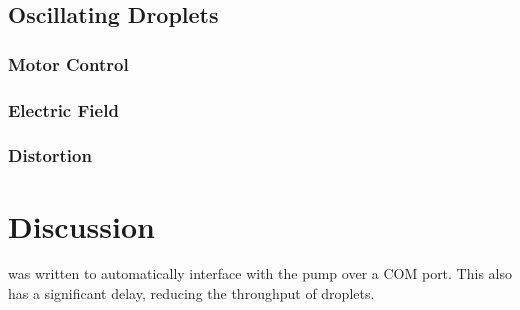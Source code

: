 \documentclass{physics_article_B}
\begin{document}
\subsection{Oscillating Droplets}
    \subsubsection{Motor Control}
    \subsubsection{Electric Field}
    \subsubsection{Distortion}
    
\section{Discussion}

was written to automatically interface with the pump over a COM port. This also has a significant delay, reducing the throughput of droplets.\\


\newpage



    

\end{document}
